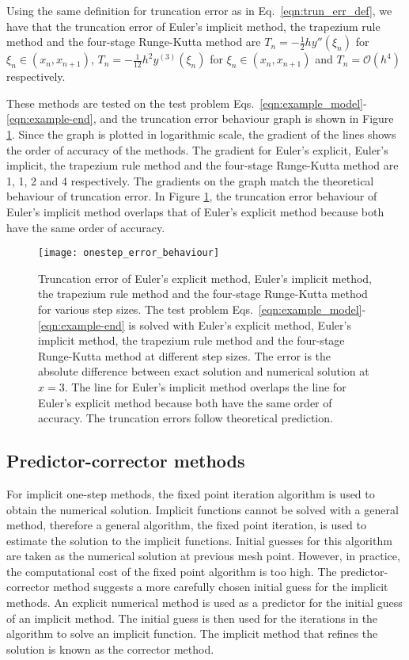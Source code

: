Using the same definition for truncation error as in Eq.~\eqref{eqn:trun_err_def}, we have that the truncation error of Euler's implicit method, the trapezium rule method and the four-stage Runge-Kutta method are $T_n = -\frac{1}{2}hy''(\xi_n)$ for $\xi_n \in (x_n, x_{n+1})$, $T_n = -\frac{1}{12}h^2y^{(3)}(\xi_n)$ for $\xi_n \in (x_n, x_{n+1})$ and $T_n = \mathcal{O}(h^4)$ respectively.

These methods are tested on the test problem Eqs.~\eqref{eqn:example_model}-\eqref{eqn:example-end}, and the truncation error behaviour graph is shown in Figure \ref{fig:onestep_error_behaviour}. Since the graph is plotted in logarithmic scale, the gradient of the lines shows the order of accuracy of the methods. The gradient for Euler's explicit, Euler's implicit, the trapezium rule method and the four-stage Runge-Kutta method are 1, 1, 2 and 4 respectively. The gradients on the graph match the theoretical behaviour of truncation error. In Figure \ref{fig:onestep_error_behaviour}, the truncation error behaviour of Euler's implicit method overlaps that of Euler's explicit method because both have the same order of accuracy. 

\begin{figure}
    \texttt{[image: onestep\_error\_behaviour]}
    \caption{Truncation error of Euler's explicit method, Euler's implicit method, the trapezium rule method and the four-stage Runge-Kutta method for various step sizes. The test problem Eqs.~\eqref{eqn:example_model}-\eqref{eqn:example-end} is solved with Euler's explicit method, Euler's implicit method, the trapezium rule method and the four-stage Runge-Kutta method at different step sizes. The error is the absolute difference between exact solution and numerical solution at $x=3$. The line for Euler's implicit method overlaps the line for Euler's explicit method because both have the same order of accuracy. The truncation errors follow theoretical prediction.}
    \label{fig:onestep_error_behaviour}
\end{figure}

\subsection{Predictor-corrector methods}
\label{sec:predictor-corrector}
For implicit one-step methods, the fixed point iteration algorithm is used to obtain the numerical solution. Implicit functions cannot be solved with a general method, therefore a general algorithm, the fixed point iteration, is used to estimate the solution to the implicit functions. Initial guesses for this algorithm are taken as the numerical solution at previous mesh point. However, in practice, the computational cost of the fixed point algorithm is too high. The predictor-corrector method suggests a more carefully chosen initial guess for the implicit methods. An explicit numerical method is used as a predictor for the initial guess of an implicit method. The initial guess is then used for the iterations in the algorithm to solve an implicit function. The implicit method that refines the solution is known as the corrector method. 


